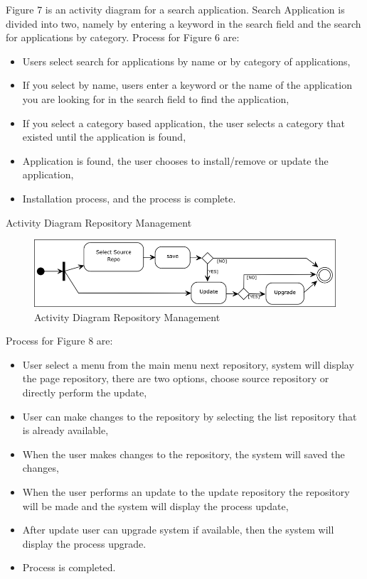 \documentclass[conference, letterpaper]{IEEEtran}
\begin{document}
Figure 7 is an activity diagram for a search application. Search Application is divided into two, namely by entering a keyword in the search field and the search for applications by category. Process for Figure 6 are:

\begin{itemize}
\item Users select search for applications by name or by category of applications,
\item If you select by name, users enter a keyword or the name of the application you are looking for in the search field to find the application,
\item If you select a category based application, the user selects a category that existed until the application is found,
\item Application is found, the user chooses to install/remove or update the application,
\item Installation process, and the process is complete.
\end{itemize}

Activity Diagram Repository Management

\begin{figure}[hbtp]
\centering
\includegraphics[scale=0.5]{image/ADManagement.png}
\caption{Activity Diagram Repository Management}
\end{figure}

Process for Figure 8 are:
\begin{itemize}
\item User select a menu from the main menu next repository, system will display the page repository, there are two options, choose source repository or directly perform the update,
\item User can make changes to the repository by selecting the list
repository that is already available,
\item When the user makes changes to the repository, the system will saved the changes,
\item When the user performs an update to the update repository the repository will be made and the system will display the process update,
\item After update user can upgrade system if available, then the system will display the process upgrade.
\item Process is completed.
\end{itemize}
\end{document}
